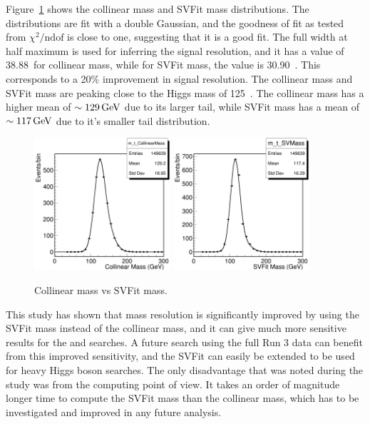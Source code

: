 Figure~\ref{fig:svfit} shows the collinear mass and SVFit mass distributions. The distributions are fit with a double Gaussian, and the goodness of fit as tested from $\chi^2/\text{ndof}$ is close to one, suggesting that it is a good fit. The full width at half maximum is used for inferring the signal resolution, and it has a value of 38.88~\GeV for collinear mass, while for SVFit mass, the value is 30.90~\GeV. This corresponds to a 20\% improvement in signal resolution. The collinear mass and SVFit mass are peaking close to the Higgs mass of 125~\GeV. The collinear mass has a higher mean of $\sim 129 \,\text{Ge\hspace{-.08em}V}$ due to its larger tail, while SVFit mass has a mean of $\sim 117 \,\text{Ge\hspace{-.08em}V}$ due to it's smaller tail distribution.

\begin{figure}[!htpb]
  \centering
  \includegraphics[width=0.45\textwidth]{plots/appendix/CollMass.png}
  \includegraphics[width=0.45\textwidth]{plots/appendix/SVFit.png}
  \caption{Collinear mass vs SVFit mass.}
  \label{fig:svfit}
\end{figure}

This study has shown that mass resolution is significantly improved by using the SVFit mass instead of the collinear mass, and it can give much more sensitive results for the \Hmt and \Het searches. A future search using the full Run 3 data can benefit from this improved sensitivity, and the SVFit can easily be extended to be used for heavy Higgs boson searches. The only disadvantage that was noted during the study was from the computing point of view. It takes an order of magnitude longer time to compute the SVFit mass than the collinear mass, which has to be investigated and improved in any future analysis.
